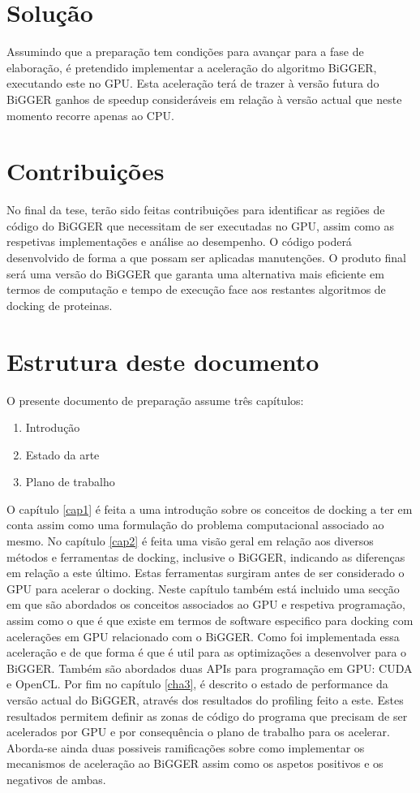 \section{Solução}
Assumindo que a preparação tem condições para avançar para a fase de elaboração, é pretendido implementar a aceleração do algoritmo BiGGER, executando este no GPU. Esta aceleração terá de trazer à versão futura do BiGGER ganhos de speedup consideráveis em relação à versão actual que neste momento recorre apenas ao CPU. 

 \section{Contribuições}
No final da tese, terão sido feitas contribuições para identificar as regiões de código do BiGGER que necessitam de ser executadas no GPU, assim como as respetivas implementações e análise ao desempenho. O código poderá desenvolvido de forma a que possam ser aplicadas manutenções. O produto final será uma versão do BiGGER que garanta uma alternativa mais eficiente em termos de computação e tempo de execução face aos restantes algoritmos de docking de proteinas.

\section{Estrutura deste documento}
O presente documento de preparação assume três capítulos:
\begin{enumerate}
\item{Introdução}
\item{Estado da arte}
\item{Plano de trabalho}
\end{enumerate}
O capítulo \ref{cap1} é feita a uma introdução sobre os conceitos de docking a ter em conta assim como uma formulação do problema computacional associado ao mesmo. No capítulo \ref{cap2} é feita uma visão geral em relação aos diversos métodos e ferramentas de docking, inclusive o BiGGER, indicando as diferenças em relação a este último. Estas ferramentas surgiram antes de ser considerado o GPU para acelerar o docking. Neste capítulo também está incluido uma secção em que são abordados os conceitos associados ao GPU e respetiva programação, assim como o que é que existe em termos de software especifico para docking com acelerações em GPU relacionado com o BiGGER. Como foi implementada essa aceleração e de que forma é que é util para as optimizações a desenvolver para o BiGGER. Também são abordados duas APIs para programação em GPU: CUDA e OpenCL.
Por fim no capítulo \ref{cha3}, é descrito o estado de performance da versão actual do BiGGER, através dos resultados do profiling feito a este. Estes resultados permitem definir as zonas de código do programa que precisam de ser acelerados por GPU e por consequência o plano de trabalho para os acelerar. Aborda-se ainda duas possiveis ramificações sobre como implementar os mecanismos de aceleração ao BiGGER assim como os aspetos positivos e os negativos de ambas. 


